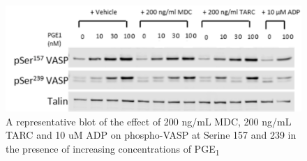 \documentclass[11pt,twoside]{bristolthesis}
\begin{document}
\begin{figure}
\includegraphics{figure/Chemokines/MDC_TARC_VASP_blot} \caption[A representative blot of the effect of MDC, TARC and ADP on PGE\textsubscript{1} stimulated phospho-VASP.]{A representative blot of the effect of 200 ng/mL MDC, 200 ng/mL TARC and 10 uM ADP on phospho-VASP at Serine 157 and 239 in the presence of increasing concentrations of PGE\textsubscript{1}}\label{fig:MDC-TARC-wp-WB-VASP}
\end{figure}
\end{document}
